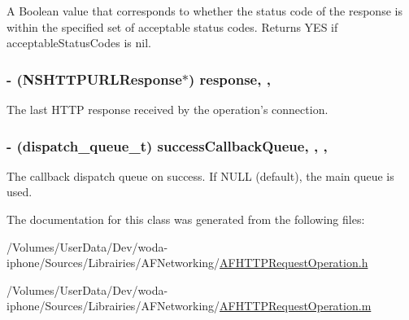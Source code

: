A Boolean value that corresponds to whether the status code of the response is within the specified set of acceptable status codes. Returns {\ttfamily Y\-E\-S} if {\ttfamily acceptable\-Status\-Codes} is {\ttfamily nil}. \hypertarget{interface_a_f_h_t_t_p_request_operation_a7a6e0248cffbdfa767d79e864fc1e730}{
\subsubsection[{response}]{\setlength{\rightskip}{0pt plus 5cm}-\/ (N\-S\-H\-T\-T\-P\-U\-R\-L\-Response$\ast$) response\hspace{0.3cm}{\ttfamily [read]}, {\ttfamily [nonatomic]}, {\ttfamily [strong]}}}\label{interface_a_f_h_t_t_p_request_operation_a7a6e0248cffbdfa767d79e864fc1e730}
The last H\-T\-T\-P response received by the operation's connection. \hypertarget{interface_a_f_h_t_t_p_request_operation_a54c7b52a48c9347ebe1782efd35a7709}{
\subsubsection[{success\-Callback\-Queue}]{\setlength{\rightskip}{0pt plus 5cm}-\/ (dispatch\-\_\-queue\-\_\-t) success\-Callback\-Queue\hspace{0.3cm}{\ttfamily [read]}, {\ttfamily [write]}, {\ttfamily [nonatomic]}, {\ttfamily [assign]}}}\label{interface_a_f_h_t_t_p_request_operation_a54c7b52a48c9347ebe1782efd35a7709}
The callback dispatch queue on success. If {\ttfamily N\-U\-L\-L} (default), the main queue is used. 

The documentation for this class was generated from the following files\-:\begin{DoxyCompactItemize}
\item 
/\-Volumes/\-User\-Data/\-Dev/woda-\/iphone/\-Sources/\-Librairies/\-A\-F\-Networking/\hyperlink{_a_f_h_t_t_p_request_operation_8h}{A\-F\-H\-T\-T\-P\-Request\-Operation.\-h}\item 
/\-Volumes/\-User\-Data/\-Dev/woda-\/iphone/\-Sources/\-Librairies/\-A\-F\-Networking/\hyperlink{_a_f_h_t_t_p_request_operation_8m}{A\-F\-H\-T\-T\-P\-Request\-Operation.\-m}\end{DoxyCompactItemize}
